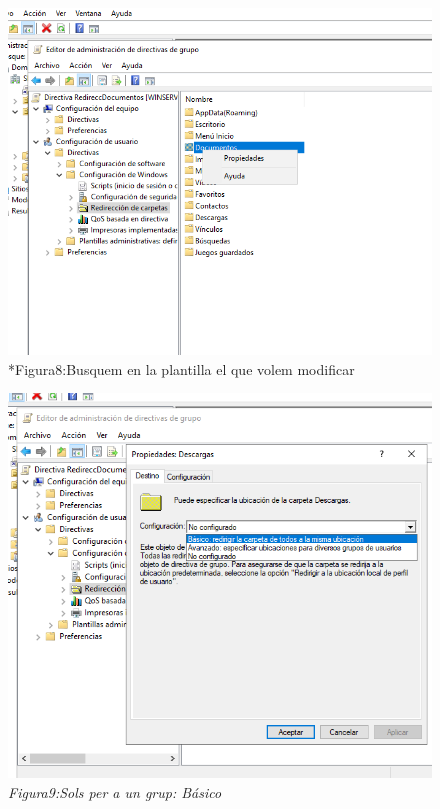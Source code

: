 \documentclass[
  a4paper,
]{article}
\begin{document}
\begin{figure}
\centering
\includegraphics{png/PropiedadesGPORedireccionar.png}
\caption{*Figura8:Busquem en la plantilla el que volem modificar}
\end{figure}

\begin{figure}
\centering
\includegraphics{png/Basico.png}
\caption{\emph{Figura9:Sols per a un grup: Básico}}
\end{figure}
\end{document}

